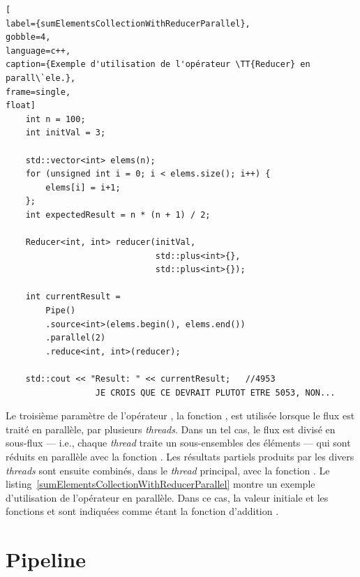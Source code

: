 \begin{lstlisting}[
label={sumElementsCollectionWithReducerParallel},
gobble=4,
language=c++,
caption={Exemple d'utilisation de l'opérateur \TT{Reducer} en parall\`ele.},
frame=single,
float]
    int n = 100;
    int initVal = 3;
    
    std::vector<int> elems(n);
    for (unsigned int i = 0; i < elems.size(); i++) {
        elems[i] = i+1;
    };
    int expectedResult = n * (n + 1) / 2;

    Reducer<int, int> reducer(initVal, 
                              std::plus<int>{}, 
                              std::plus<int>{});

	int currentResult =
		Pipe()
		.source<int>(elems.begin(), elems.end())
		.parallel(2)
		.reduce<int, int>(reducer); 
	
	std::cout << "Result: " << currentResult;	//4953 
                  JE CROIS QUE CE DEVRAIT PLUTOT ETRE 5053, NON...
\end{lstlisting}




Le troisi\`eme param\`etre de l'op\'erateur , la fonction , est utilis\'ee lorsque le flux est trait\'e en parall\`ele, par plusieurs \emph{threads}. Dans un tel cas, le flux est divis\'e en sous-flux --- i.e., chaque \emph{thread} traite un sous-ensembles des éléments --- qui sont r\'eduits en parall\`ele avec la fonction . Les r\'esultats partiels produits par les divers \emph{threads} sont ensuite combin\'es, dans le \emph{thread} principal, avec la fonction . Le listing~\ref{sumElementsCollectionWithReducerParallel} montre un exemple d'utilisation de l'op\'erateur  en parall\`ele. Dans ce cas, la valeur initiale  et les fonctions  et  sont indiqu\'ees comme \'etant la fonction d'addition . 




\section{Pipeline}



